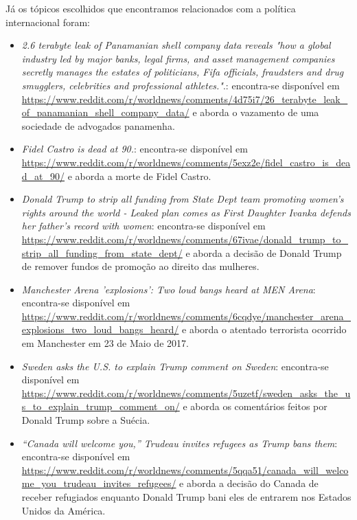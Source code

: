 Já os tópicos escolhidos que encontramos relacionados com a política
internacional foram:
\begin{itemize}
  \item
  \textit{2.6 terabyte leak of Panamanian shell company data reveals "how a
  global industry led by major banks, legal firms, and asset management companies
  secretly manages the estates of politicians, Fifa officials, fraudsters and
  drug smugglers, celebrities and professional
  athletes."}.: encontra-se disponível em
  \url{https://www.reddit.com/r/worldnews/comments/4d75i7/26_terabyte_leak_of_panamanian_shell_company_data/}
  e aborda o vazamento de uma sociedade de advogados panamenha.
  \item
  \textit{Fidel Castro is dead at
  90.}: encontra-se disponível em
  \url{https://www.reddit.com/r/worldnews/comments/5exz2e/fidel_castro_is_dead_at_90/}
  e aborda a morte de Fidel Castro.
  
  \item
  \textit{Donald Trump to strip all funding from State Dept team promoting
  women's rights around the world - Leaked plan comes as First Daughter Ivanka
  defends her father's record with women}: encontra-se disponível em
  \url{https://www.reddit.com/r/worldnews/comments/67ivae/donald_trump_to_strip_all_funding_from_state_dept/}
  e aborda a decisão de Donald Trump de remover fundos de promoção ao direito
  das mulheres.
  
  \item
  \textit{Manchester Arena 'explosions': Two loud bangs heard at MEN Arena}:
  encontra-se disponível em
  \url{https://www.reddit.com/r/worldnews/comments/6cqdye/manchester_arena_explosions_two_loud_bangs_heard/}
  e aborda o atentado terrorista ocorrido em Manchester em 23 de Maio de 2017.
  
  \item
  \textit{Sweden asks the U.S. to explain Trump comment on
  Sweden}: encontra-se disponível em
  \url{https://www.reddit.com/r/worldnews/comments/5uzetf/sweden_asks_the_us_to_explain_trump_comment_on/}
  e aborda os comentários feitos por Donald Trump sobre a Suécia.
  
  \item\textit{“Canada will welcome you,” Trudeau invites refugees as Trump bans
  them}: encontra-se disponível em
  \url{https://www.reddit.com/r/worldnews/comments/5qqa51/canada_will_welcome_you_trudeau_invites_refugees/}
  e aborda a decisão do Canada de receber refugiados enquanto Donald Trump bani
  eles de entrarem nos Estados Unidos da América.
\end{itemize}

